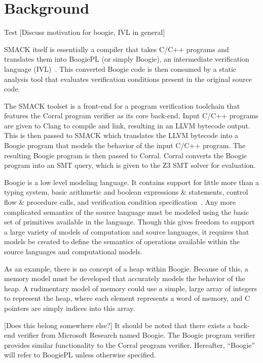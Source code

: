 \chapter{Background}{Test}
[Discuss motivation for boogie, IVL in general]

SMACK itself is essentially a compiler that takes C/C++ programs and translates them into BoogiePL (or simply Boogie), an intermediate verification language (IVL)~\cite{smack}.  This converted Boogie code is then consumed by a static analysis tool that evaluates verification conditions present in the original source code.

The SMACK toolset is a front-end for a program verification toolchain that features the Corral program verifier as its core back-end.  Input C/C++ programs are given to Clang to compile and link, resulting in an LLVM bytecode output.  This is then passed to SMACK which translates the LLVM bytecode into a Boogie program that models the behavior of the input C/C++ program.  The resulting Boogie program is then passed to Corral.  Corral converts the Boogie program into an SMT query, which is given to the Z3 SMT solver for evaluation.

Boogie is a low level modeling language.  It contains support for little more than a typing system, basic arithmetic and boolean expressions \& statements, control flow \& procedure calls, and verification condition specification~\cite{boogie}.  Any more complicated semantics of the source language must be modeled using the basic set of primitives available in the language.  Though this gives freedom to support a large variety of models of computation and source languages, it requires that models be created to define the semantics of operations available within the source languages and computational models.

As an example, there is no concept of a heap within Boogie.  Because of this, a memory model must be developed that accurately models the behavior of the heap.  A rudimentary model of memory could use a simple, large array of integers to represent the heap, where each element represents a word of memory, and C pointers are simply indices into this array.

[Does this belong somewhere else?] It should be noted that there exists a back-end verifier from Microsoft Research named Boogie.  The Boogie program verifier provides similar functionality to the Corral program verifier.  Hereafter, ``Boogie'' will refer to BoogiePL unless otherwise specified.

